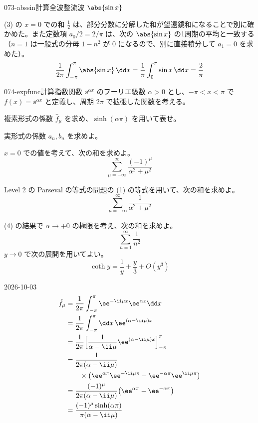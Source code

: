 \documentclass[uplatex,dvipdfmx,a4paper,11pt]{jsarticle}
\begin{document}
\begin{mondai}{073-abssin}{計算}{全波整流波 $\abs{\sin x}$}
\begin{tadashii}
\kenzan (3) の $x=0$ での和 $\frac{1}{2}$ は、部分分数に分解した和が望遠鏡和になることで別に確かめた。また定数項 $a_0/2=2/\pi$ は、次の $\abs{\sin x}$ の1周期の平均と一致する（$n=1$ は一般式の分母 $1-n^{2}$ が $0$ になるので、別に直接積分して $a_1=0$ を求めた）。
\[
\frac{1}{2\pi}\int_{-\pi}^{\pi}\abs{\sin x}\,\dd x=\frac{1}{\pi}\int_{0}^{\pi}\sin x\,\dd x=\frac{2}{\pi}
\]
\end{tadashii}
\end{mondai}

\begin{mondai}{074-expfunc}{計算}{指数関数 $\ee^{\alpha x}$ のフーリエ級数}
$\alpha>0$ とし、$-\pi<x<\pi$ で $f(x)=\ee^{\alpha x}$ と定義し、周期 $2\pi$ で拡張した関数を考える。
\begin{shoumon}
  \item 複素形式の係数 $\hat{f}_{\mu}$ を求め、$\sinh(\alpha\pi)$ を用いて表せ。
  \item 実形式の係数 $a_n,b_n$ を求めよ。
  \item $x=0$ での値を考えて、次の和を求めよ。
\[
\sum_{\mu=-\infty}^{\infty}\frac{(-1)^{\mu}}{\alpha^{2}+\mu^{2}}
\]
  \item Level 2 の Parseval の等式の問題の (1) の等式を用いて、次の和を求めよ。
\[
\sum_{\mu=-\infty}^{\infty}\frac{1}{\alpha^{2}+\mu^{2}}
\]
  \item (4) の結果で $\alpha\to+0$ の極限を考え、次の和を求めよ。
\[
\sum_{n=1}^{\infty}\frac{1}{n^{2}}
\]
$y\to0$ で次の展開を用いてよい。
\[
\coth y=\frac{1}{y}+\frac{y}{3}+O(y^{3})
\]
\end{shoumon}
\begin{kotaeutsushi}{2026-10-03}
\begin{align*}
  \hat{f}_{\mu}&=\frac{1}{2\pi}\int_{-\pi}^{\pi}\ee^{-\ii\mu x}\ee^{\alpha x}\dd x\\
  &=\frac{1}{2\pi}\int_{-\pi}^{\pi}\dd x\,\ee^{(\alpha-\ii\mu)x}\\
  &=\frac{1}{2\pi}\Bigl[\frac{1}{\alpha-\ii\mu}\ee^{(\alpha-\ii\mu)x}\Bigr]_{-\pi}^{\pi}\\
  &=\frac{1}{2\pi(\alpha-\ii\mu)}\\
  &\qquad\times\bigl(\ee^{\alpha\pi}\ee^{-\ii\mu\pi}-\ee^{-\alpha\pi}\ee^{\ii\mu\pi}\bigr)\\
  &=\frac{(-1)^{\mu}}{2\pi(\alpha-\ii\mu)}\bigl(\ee^{\alpha\pi}-\ee^{-\alpha\pi}\bigr)\\
  &=\frac{(-1)^{\mu}\sinh(\alpha\pi)}{\pi(\alpha-\ii\mu)}

\end{align*}
\end{kotaeutsushi}
\end{mondai}
\end{document}
